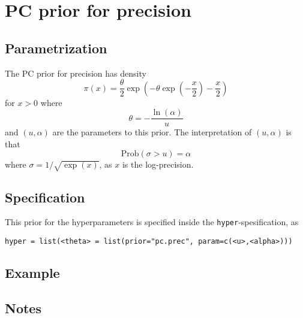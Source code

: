 \documentclass[a4paper,11pt]{article}
\begin{document}
\section*{PC prior for precision}

\subsection*{Parametrization}
The PC prior for precision has density 
\begin{equation}
    \pi(x) = \frac{\theta}{2} \exp\left(
      -\theta\exp\left(-\frac{x}{2}\right) - \frac{x}{2}
    \right)
\end{equation}
for $x>0$ where
\begin{displaymath}
    \theta = -\frac{\ln(\alpha)}{u}
\end{displaymath}
and $(u, \alpha{})$ are the parameters to this prior. The
interpretation of $(u,\alpha)$ is that
\begin{displaymath}
    \text{Prob}(\sigma > u) = \alpha
\end{displaymath}
where $\sigma = 1/\sqrt{\exp(x)}$, as $x$ is the log-precision.

\subsection*{Specification}
This prior for the hyperparameters is specified inside the
\texttt{hyper}-spesification, as
\begin{center}
    \texttt{hyper = list(<theta> =
        list(prior="pc.prec", param=c(<u>,<alpha>)))}
\end{center}

\subsection*{Example}

\subsection*{Notes}
\end{document}
